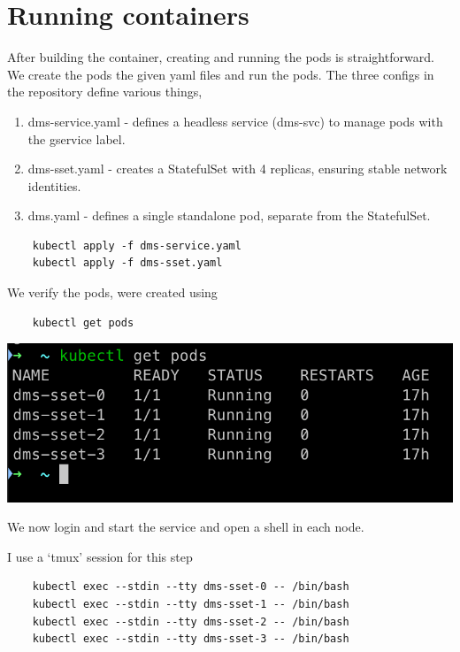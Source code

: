 \documentclass{article}
\begin{document}
\section{Running containers}

After building the container, creating and running the pods is straightforward. We create the pods the given yaml files and run the pods. The three configs in the repository define various things,

\begin{enumerate}
    \item dms-service.yaml - defines a headless service (dms-svc) to manage pods with the gservice label.
    \item dms-sset.yaml - creates a StatefulSet with 4 replicas, ensuring stable network identities.
    \item dms.yaml - defines a single standalone pod, separate from the StatefulSet.
\end{enumerate}

\begin{lstlisting}
    kubectl apply -f dms-service.yaml
    kubectl apply -f dms-sset.yaml
\end{lstlisting}

We verify the pods, were created using

\begin{lstlisting}
    kubectl get pods
\end{lstlisting}

\begin{center}
    \includegraphics[scale=0.5]{pods.png}
\end{center}

We now login and start the service and open a shell in each node.

I use a `tmux' session for this step

\begin{lstlisting}
    kubectl exec --stdin --tty dms-sset-0 -- /bin/bash
    kubectl exec --stdin --tty dms-sset-1 -- /bin/bash
    kubectl exec --stdin --tty dms-sset-2 -- /bin/bash
    kubectl exec --stdin --tty dms-sset-3 -- /bin/bash
\end{lstlisting}
\end{document}
